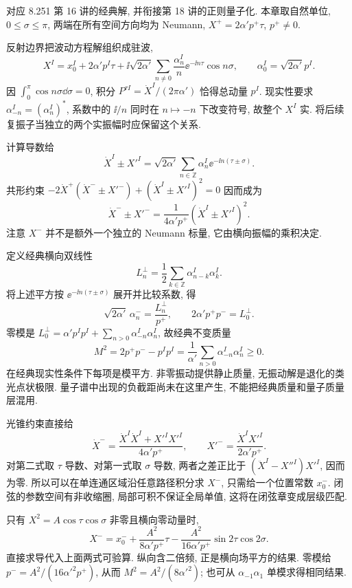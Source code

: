\label{ch:basic-lightcone}
对应 8.251 第 16 讲的经典解, 并衔接第 18 讲的正则量子化. 本章取自然单位, $0\leq\sigma\leq\pi$, 两端在所有空间方向均为 Neumann, $X^+=2\alpha'p^+\tau$, $p^+\ne0$.

反射边界把波动方程解组织成驻波,
\begin{equation}\label{eq:openmodes}
 X^I=x_0^I+2\alpha'p^I\tau
 +\ii\sqrt{2\alpha'}\sum_{n\ne0}\frac{\alpha_n^I}{n}
 \ee^{-\ii n\tau}\cos n\sigma,
 \qquad\alpha_0^I=\sqrt{2\alpha'}p^I.
\end{equation}
因 $\int_0^\pi\cos n\sigma\dd\sigma=0$, 积分 $P^{\tau I}=\dot X^I/(2\pi\alpha')$ 恰得总动量 $p^I$. 现实性要求 $\alpha_{-n}^I=(\alpha_n^I)^*$, 系数中的 $\ii/n$ 同时在 $n\mapsto-n$ 下改变符号, 故整个 $X^I$ 实. 将后续复振子当独立的两个实振幅时应保留这个关系.

计算导数给
\[
 \dot X^I\pm X'^I=\sqrt{2\alpha'}\sum_{n\in\mathbb Z}
 \alpha_n^I\ee^{-\ii n(\tau\pm\sigma)}.
\]
共形约束 $-2\dot X^+(\dot X^-\pm X'^-)+(\dot X^I\pm X'^I)^2=0$ 因而成为
\[
 \dot X^-\pm X'^-=\frac1{4\alpha'p^+}(\dot X^I\pm X'^I)^2.
\]
注意 $X^-$ 并不是额外一个独立的 Neumann 标量, 它由横向振幅的乘积决定.

定义经典横向双线性
\[
 L_n^\perp=\frac12\sum_{k\in\mathbb Z}
 \alpha_{n-k}^I\alpha_k^I.
\]
将上述平方按 $\ee^{-\ii n(\tau\pm\sigma)}$ 展开并比较系数, 得
\[
 \sqrt{2\alpha'}\,\alpha_n^-=\frac{L_n^\perp}{p^+},
 \qquad 2\alpha'p^+p^-=L_0^\perp.
\]
零模是 $L_0^\perp=\alpha'p^Ip^I+\sum_{n>0}\alpha_{-n}^I\alpha_n^I$, 故经典不变质量
\[
 M^2=2p^+p^--p^Ip^I
 =\frac1{\alpha'}\sum_{n>0}\alpha_{-n}^I\alpha_n^I\geq0.
\]
在经典现实性条件下每项是模平方. 非零振动提供静止质量, 无振动解是退化的类光点状极限. 量子谱中出现的负截距尚未在这里产生, 不能把经典质量和量子质量层混用.

光锥约束直接给
\[
 \dot X^-=\frac{\dot X^I\dot X^I+X'^IX'^I}{4\alpha'p^+},
 \qquad X'^-=\frac{\dot X^IX'^I}{2\alpha'p^+}.
\]
对第二式取 $\tau$ 导数、对第一式取 $\sigma$ 导数, 两者之差正比于 $(\ddot X^I-X''^I)X'^I$, 因而为零. 所以可以在单连通区域沿任意路径积分求 $X^-$, 只需给一个位置常数 $x_0^-$. 闭弦的参数空间有非收缩圈, 局部可积不保证全局单值, 这将在闭弦章变成层级匹配.

\begin{example}
只有 $X^2=A\cos\tau\cos\sigma$ 非零且横向零动量时,
\[
 X^- =x_0^-+\frac{A^2}{8\alpha'p^+}\tau
 -\frac{A^2}{16\alpha'p^+}\sin2\tau\cos2\sigma.
\]
直接求导代入上面两式可验算. 纵向含二倍频, 正是横向场平方的结果. 零模给 $p^-=A^2/(16\alpha'^2p^+)$, 从而 $M^2=A^2/(8\alpha'^2)$; 也可从 $\alpha_{-1}\alpha_1$ 单模求得相同结果.
\end{example}

